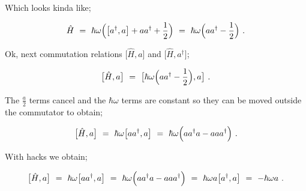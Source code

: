 \documentclass{article}
\begin{document}
Which looks kinda like;

\begin{equation} \label{eb-eq-256-20}
\hat{H} \hspace{0.125cm} = \hspace{0.125cm} \hbar \omega \Big( \big[ a^{\dagger} , a \big] + a a^{\dagger} +\frac{1}{2} \Big) \hspace{0.125cm} = \hspace{0.125cm} \hbar \omega \Big( a a^{\dagger} - \frac{1}{2} \Big) \hspace{0.125cm} .
\end{equation}

Ok, next commutation relations \begin{math} \big[ \hat{H} , a \big] \end{math} and \begin{math} \big[ \hat{H} , a^{\dagger} \big] \end{math};

\begin{equation} \label{eb-eq-256-21}
\big[ \hat{H} , a \big]\hspace{0.125cm} = \hspace{0.125cm} \big[ \hbar \omega \Big( a a^{\dagger} - \frac{1}{2} \Big) , a \big] \hspace{0.125cm} .
\end{equation}

The \begin{math} \frac{a}{2} \end{math} terms cancel and the  \begin{math} \hbar \omega \end{math} terms are constant so they can be moved outside the commutator to obtain;

\begin{equation} \label{eb-eq-256-22}
\big[ \hat{H} , a \big] \hspace{0.125cm} = \hspace{0.125cm} \hbar \omega \big[ a a^{\dagger}  , a \big] \hspace{0.125cm} = \hspace{0.125cm} \hbar \omega \Big( a a^{\dagger} a - a a a^{\dagger} \Big) \hspace{0.125cm} .
\end{equation}

With hacks we obtain;

\begin{equation} \label{eb-eq-256-23}
\big[ \hat{H} , a \big] \hspace{0.125cm} = \hspace{0.125cm} \hbar \omega \big[ a a^{\dagger}  , a \big] \hspace{0.125cm} = \hspace{0.125cm} \hbar \omega \Big( a a^{\dagger} a - a a a^{\dagger} \Big) \hspace{0.125cm} = \hspace{0.125cm} \hbar \omega a \big[  a^{\dagger}  , a \big] \hspace{0.125cm} = \hspace{0.125cm} - \hbar \omega a \hspace{0.125cm}  .
\end{equation}
\end{document}
